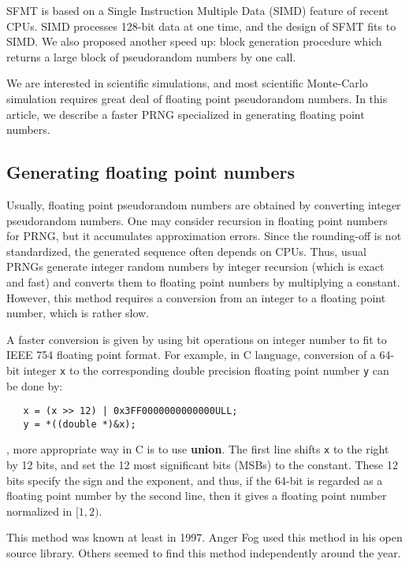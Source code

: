 \documentclass{svmult}
\begin{document}
SFMT is based on a Single Instruction Multiple Data\cite{wiki:SIMD}
(SIMD) feature of recent CPUs. SIMD processes 128-bit data
at one time, and the design of SFMT fits to SIMD.
We also proposed another speed up: block generation 
procedure which returns a large block of pseudorandom numbers by one
call.  

We are interested in scientific simulations, and most scientific
Monte-Carlo simulation requires great deal of floating point
pseudorandom numbers. In this article, we describe a faster PRNG
specialized in generating floating point numbers.

\subsection{Generating floating point numbers}
\label{sec:floating}

Usually, floating point pseudorandom numbers are obtained by
converting integer pseudorandom numbers. 
One may consider recursion in floating
point numbers for PRNG, but it accumulates approximation errors.
Since the rounding-off is not standardized, the generated
sequence often depends on CPUs. 
Thus, usual PRNGs generate integer random numbers by integer recursion
(which is exact and fast) and converts them 
to floating point numbers by multiplying a constant.
However, this method requires a conversion from an integer to
a floating point number, which is rather slow.

A faster conversion is given by using bit operations on integer
number to fit to IEEE 754 floating point format. For example, in C
language, conversion of a 64-bit integer \texttt{x} to 
the corresponding double precision floating point number \texttt{y} can be done by:
\begin{verbatim}
   x = (x >> 12) | 0x3FF0000000000000ULL;
   y = *((double *)&x);
\end{verbatim}, more appropriate way in C is to use \textbf{union}.
The first line shifts \texttt{x} to the right by 12 bits,
and set the 12 most significant bits (MSBs) to the constant.
These 12 bits specify the sign and the exponent, and thus, if the 64-bit
is regarded as a floating point number by the second line, then 
it gives a floating point number normalized in $[1,2)$.

This method was known at least in 1997. Anger Fog used this method in
his open source library\cite{web:Fog}.  Others seemed to find this method
independently around the year.
\end{document}
